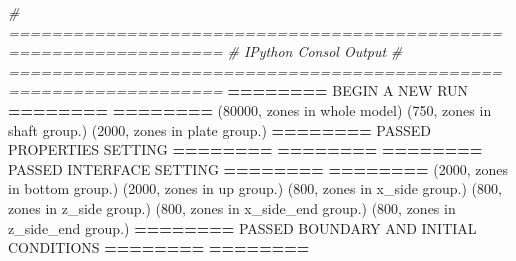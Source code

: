 \documentclass[a4paper, nobind]{templates/ociamthesis}
\newenvironment{Shaded}{\begin{snugshade}}{\end{snugshade}}
\newcommand{\CommentTok}[1]{\textcolor[rgb]{0.56,0.35,0.01}{\textit{#1}}}
\newcommand{\DecValTok}[1]{\textcolor[rgb]{0.00,0.00,0.81}{#1}}
\newcommand{\NormalTok}[1]{#1}
\newcommand{\OperatorTok}[1]{\textcolor[rgb]{0.81,0.36,0.00}{\textbf{#1}}}
\newcommand{\StringTok}[1]{\textcolor[rgb]{0.31,0.60,0.02}{#1}}
\renewenvironment{Shaded}
{
  \vspace{10pt}%
  \begin{snugshade}%
}{%
  \end{snugshade}%
  \vspace{8pt}%
}
\begin{document}
\begin{Shaded}
\begin{Highlighting}[]
\CommentTok{\# ==================================================================}
\CommentTok{\#   IPython Consol Output}
\CommentTok{\# ==================================================================}
               \OperatorTok{========}\NormalTok{ BEGIN A NEW RUN }\OperatorTok{========}        \OperatorTok{========}
\NormalTok{(}\DecValTok{80000}\NormalTok{, }\StringTok{\textquotesingle{}zones in whole model\textquotesingle{}}\NormalTok{)}
\NormalTok{(}\DecValTok{750}\NormalTok{, }\StringTok{\textquotesingle{}zones in shaft group.\textquotesingle{}}\NormalTok{)}
\NormalTok{(}\DecValTok{2000}\NormalTok{, }\StringTok{\textquotesingle{}zones in plate group.\textquotesingle{}}\NormalTok{)}
               \OperatorTok{========}\NormalTok{ PASSED PROPERTIES SETTING }\OperatorTok{========}        \OperatorTok{========}
               \OperatorTok{========}\NormalTok{ PASSED INTERFACE SETTING }\OperatorTok{========}        \OperatorTok{========}
\NormalTok{(}\DecValTok{2000}\NormalTok{, }\StringTok{\textquotesingle{}zones in bottom group.\textquotesingle{}}\NormalTok{)}
\NormalTok{(}\DecValTok{2000}\NormalTok{, }\StringTok{\textquotesingle{}zones in up group.\textquotesingle{}}\NormalTok{)}
\NormalTok{(}\DecValTok{800}\NormalTok{, }\StringTok{\textquotesingle{}zones in x\_side group.\textquotesingle{}}\NormalTok{)}
\NormalTok{(}\DecValTok{800}\NormalTok{, }\StringTok{\textquotesingle{}zones in z\_side group.\textquotesingle{}}\NormalTok{)}
\NormalTok{(}\DecValTok{800}\NormalTok{, }\StringTok{\textquotesingle{}zones in x\_side\_end group.\textquotesingle{}}\NormalTok{)}
\NormalTok{(}\DecValTok{800}\NormalTok{, }\StringTok{\textquotesingle{}zones in z\_side\_end group.\textquotesingle{}}\NormalTok{)}
               \OperatorTok{========}\NormalTok{ PASSED BOUNDARY AND INITIAL CONDITIONS }\OperatorTok{========}        \OperatorTok{========}


\end{Highlighting}
\end{Shaded}
\end{document}
